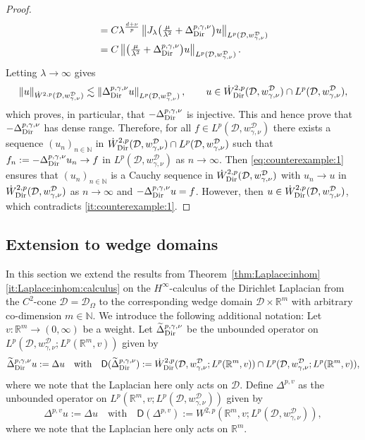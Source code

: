 \documentclass[12pt,a4paper, reqno]{amsart}
\theoremstyle{plain}
\theoremstyle{definition}
\theoremstyle{remark}
\numberwithin{equation}{section}
\newcommand{\1}{\mathbbm{1}}
\newcommand{\R}{\ensuremath{\mathbb{R}}}
\newcommand{\N}{\ensuremath{\mathbb{N}}}
\newcommand{\calD}{\ensuremath{\mathcal{D}}}
\newcommand{\sfD}{\ensuremath{\mathsf{D}}}
\newcommand{\Dir}{\textup{Dir}}
\newcommand{\nrm}[1]{\left\lVert #1 \right\rVert}
\begin{document}
\begin{proof}
\begin{equation}
\begin{aligned}
        &=C \lambda^{\frac{d+\nu}{p}}\nrm{J_\lambda\big(\tfrac{\mu}{\lambda^2}+\Delta_\Dir^{p,\gamma,\nu}\big)u}_{L^p(\calD,w_{\gamma,\nu}^\calD)}\\
        &= C\nrm{\big(\tfrac{\mu}{\lambda^2}+\Delta_\Dir^{p,\gamma,\nu}\big)u}_{L^p(\calD,w_{\gamma,\nu}^\calD)}.
        \end{aligned}
    \end{equation}
    Letting $\lambda\rightarrow \infty$ gives $$\nrm{u}_{\Dot W^{2,p}(\calD,w_{\gamma,\nu}^\calD)}\lesssim \nrm{\Delta_\Dir^{p,\gamma,\nu}u}_{L^p(\calD,w_{\gamma,\nu}^\calD)},\qquad  u\in \Dot W^{2,p}_\Dir (\calD,w_{\gamma,\nu}^\calD)\cap L^p(\calD,w_{\gamma,\nu}^\calD), $$
    which proves, in particular, that $-\Delta_\Dir^{p,\gamma,\nu}$ is injective. This and \cite[Proposition~10.1.9]{aibs2} hence prove that $-\Delta_\Dir^{p,\gamma,\nu}$ has dense range. Therefore, for all $f\in L^p(\calD,w_{\gamma,\nu}^\calD)$ there exists a sequence $(u_n)_{n\in\N}$ in $\Dot W^{2,p}_\Dir (\calD,w_{\gamma,\nu}^\calD)\cap L^p(\calD,w_{\gamma,\nu}^\calD) $ such that $f_n:= -\Delta_\Dir^{p,\gamma,\nu}u_n \rightarrow f$ in $L^p(\calD,w_{\gamma,\nu}^\calD)$ as $n\to\infty$. 
    Then \eqref{eq:counterexample:1} ensures that $(u_n)_{n\in\N}$ is a Cauchy sequence in $\Dot W^{2,p}_\Dir(\calD,w_{\gamma,\nu}^\calD)$ with $u_n \to u $ in $ \Dot W^{2,p}_\Dir(\calD,w_{\gamma,\nu}^\calD) $ as $ n\rightarrow\infty$ and $-\Delta_\Dir^{p,\gamma,\nu}u=f$. However, then $u\in \Dot W^{2,p}_\Dir(\calD,w_{\gamma,\nu}^\calD)$, which contradicts \ref{it:counterexample:1}.
\end{proof}
\subsection{Extension to wedge domains}\label{sec:wedge}
In this section we extend the results from Theorem~\ref{thm:Laplace:inhom}\ref{it:Laplace:inhom:calculus} on the $H^\infty$-calculus of the Dirichlet Laplacian from the $C^2$-cone $\calD=\calD_\Omega$ to the corresponding wedge domain $\calD\times\R^m$ with arbitrary co-dimension $m\in\N$.
We introduce the following additional notation: Let $v\colon \R^m\to (0,\infty)$ be a weight. Let $\widetilde\Delta_\Dir^{p,\gamma,\nu}$ be the unbounded operator on $L^p(\calD,w_{\gamma,\nu}^\calD;L^p(\R^m,v))$ given by 
\[\widetilde\Delta_\Dir^{p,\gamma,\nu}u:=\Delta u \quad \text{with}\quad \sfD(\widetilde\Delta_\Dir^{p,\gamma,\nu}):=\Dot W^{2,p}_\Dir(\calD,w_{\gamma,\nu}^\calD;L^p(\R^m,v))\cap L^p(\calD,w_{\gamma,\nu}^\calD;L^p(\R^m,v)),\]
where we note that the Laplacian here only acts on $\calD$. 
Define $\Delta^{p,v}$ as the   unbounded operator on $L^p(\R^m,v;L^p(\calD,w_{\gamma,\nu}^\calD))$ given by 
    \[ \Delta^{p,v}u:= \Delta u \quad\text{with}\quad \sfD(\Delta^{p,v}):= W^{2,p}(\R^m, v;L^p(\calD,w_{\gamma,\nu}^\calD)),\]
    where we note that the Laplacian here only acts on $\R^m$. 
\end{document}
